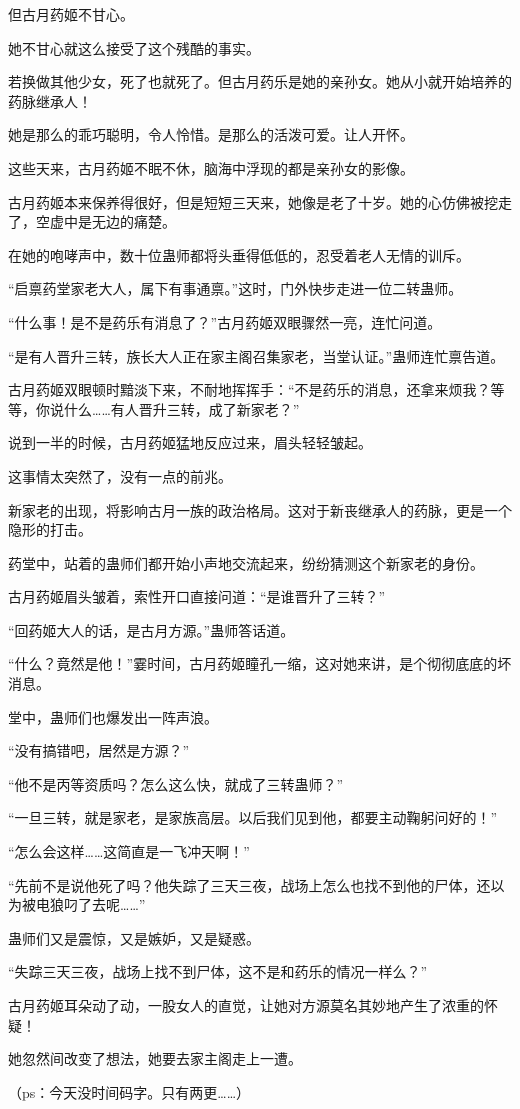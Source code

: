 \begin{this_body}
但古月药姬不甘心。

她不甘心就这么接受了这个残酷的事实。

若换做其他少女，死了也就死了。但古月药乐是她的亲孙女。她从小就开始培养的药脉继承人！

她是那么的乖巧聪明，令人怜惜。是那么的活泼可爱。让人开怀。

这些天来，古月药姬不眠不休，脑海中浮现的都是亲孙女的影像。

古月药姬本来保养得很好，但是短短三天来，她像是老了十岁。她的心仿佛被挖走了，空虚中是无边的痛楚。

在她的咆哮声中，数十位蛊师都将头垂得低低的，忍受着老人无情的训斥。

“启禀药堂家老大人，属下有事通禀。”这时，门外快步走进一位二转蛊师。

“什么事！是不是药乐有消息了？”古月药姬双眼骤然一亮，连忙问道。

“是有人晋升三转，族长大人正在家主阁召集家老，当堂认证。”蛊师连忙禀告道。

古月药姬双眼顿时黯淡下来，不耐地挥挥手：“不是药乐的消息，还拿来烦我？等等，你说什么……有人晋升三转，成了新家老？”

说到一半的时候，古月药姬猛地反应过来，眉头轻轻皱起。

这事情太突然了，没有一点的前兆。

新家老的出现，将影响古月一族的政治格局。这对于新丧继承人的药脉，更是一个隐形的打击。

药堂中，站着的蛊师们都开始小声地交流起来，纷纷猜测这个新家老的身份。

古月药姬眉头皱着，索性开口直接问道：“是谁晋升了三转？”

“回药姬大人的话，是古月方源。”蛊师答话道。

“什么？竟然是他！”霎时间，古月药姬瞳孔一缩，这对她来讲，是个彻彻底底的坏消息。

堂中，蛊师们也爆发出一阵声浪。

“没有搞错吧，居然是方源？”

“他不是丙等资质吗？怎么这么快，就成了三转蛊师？”

“一旦三转，就是家老，是家族高层。以后我们见到他，都要主动鞠躬问好的！”

“怎么会这样……这简直是一飞冲天啊！”

“先前不是说他死了吗？他失踪了三天三夜，战场上怎么也找不到他的尸体，还以为被电狼叼了去呢……”

蛊师们又是震惊，又是嫉妒，又是疑惑。

“失踪三天三夜，战场上找不到尸体，这不是和药乐的情况一样么？”

古月药姬耳朵动了动，一股女人的直觉，让她对方源莫名其妙地产生了浓重的怀疑！

她忽然间改变了想法，她要去家主阁走上一遭。

（ps：今天没时间码字。只有两更……）

\end{this_body}

